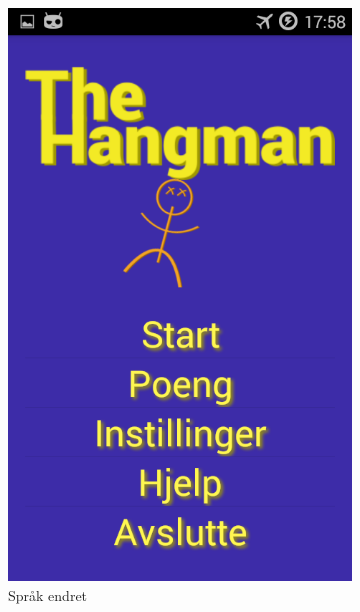 \begin{figure}[ht]
    \centering
   \begin{subfigure}[b]{0.25\textwidth}
        \includegraphics[width=\textwidth]{./img/bruksanvisning/10.png}
        \caption{Språk endret}
        \label{fig:innstillinger_endret}
    \end{subfigure}
    \begin{subfigure}[b]{0.25\textwidth}

\end{subfigure}
\end{figure}
